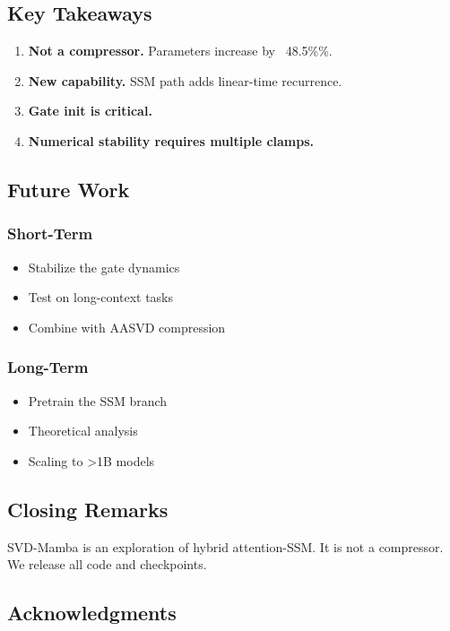 \subsection{Key Takeaways}

\begin{enumerate}
\item \textbf{Not a compressor.} Parameters increase by ~48.5\%\%.
\item \textbf{New capability.} SSM path adds linear-time recurrence.
\item \textbf{Gate init is critical.}
\item \textbf{Numerical stability requires multiple clamps.}

\end{enumerate}
\subsection{Future Work}

\subsubsection{Short-Term}
\begin{itemize}
\item Stabilize the gate dynamics
\item Test on long-context tasks
\item Combine with AASVD compression

\end{itemize}
\subsubsection{Long-Term}
\begin{itemize}
\item Pretrain the SSM branch
\item Theoretical analysis
\item Scaling to \textgreater{}1B models

\end{itemize}
\subsection{Closing Remarks}

SVD-Mamba is an exploration of hybrid attention-SSM. It is not a 
compressor. We release all code and checkpoints.

\subsection{Acknowledgments}

